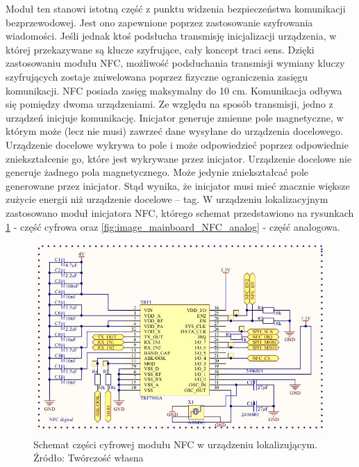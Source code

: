 Moduł ten stanowi istotną część z punktu widzenia bezpieczeństwa komunikacji bezprzewodowej. Jest ono zapewnione poprzez zastosowanie szyfrowania wiadomości. Jeśli jednak ktoś podsłucha transmisję inicjalizacji urządzenia, w której przekazywane są klucze szyfrujące, cały koncept traci sens. Dzięki zastosowaniu modułu NFC, możliwość podsłuchania transmisji wymiany kluczy szyfrujących zostaje zniwelowana poprzez fizyczne ograniczenia zasięgu komunikacji. NFC posiada zasięg maksymalny do 10 cm.
Komunikacja odbywa się pomiędzy dwoma urządzeniami. Ze względu na sposób transmisji, jedno z urządzeń inicjuje komunikację. Inicjator generuje zmienne pole magnetyczne, w którym może (lecz nie musi) zawrzeć dane wysyłane do urządzenia docelowego. Urządzenie docelowe wykrywa to pole i może odpowiedzieć poprzez odpowiednie zniekształcenie go, które jest wykrywane przez inicjator. Urządzenie docelowe nie generuje żadnego pola magnetycznego. Może jedynie zniekształcać pole generowane przez inicjator. Stąd wynika, że inicjator musi mieć znacznie większe zużycie energii niż urządzenie docelowe – tag. W urządzeniu lokalizacyjnym zastosowano moduł inicjatora NFC, którego schemat przedstawiono na rysunkach \ref{fig:image_mainboard_NFC_digital} - część cyfrowa oraz \ref{fig:image_mainboard_NFC_analog} - część analogowa.

\begin{figure}[H]
	\centering
	\includegraphics[width=15cm]{img/schematics/mainboard_NFC_chip.jpg}
	\caption{Schemat części cyfrowej modułu NFC w urządzeniu lokalizującym. \\ Źródło: Twórczość własna}
	\label{fig:image_mainboard_NFC_digital}
\end{figure}

